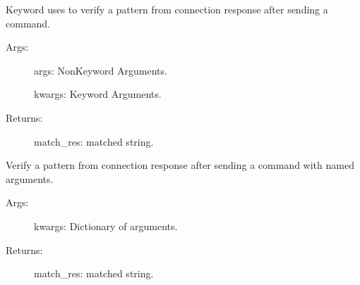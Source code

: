 \documentclass[letterpaper,10pt,english]{sphinxmanual}
\begin{document}
\begin{fulllineitems}
\begin{fulllineitems}
\begin{description}
\end{description}

\end{fulllineitems}


\begin{fulllineitems}
\label{\detokenize{QConnectionLibrary:QConnectionLibrary.connection_manager.ConnectionManager.verify}}
\sphinxAtStartPar
Keyword uses to verify a pattern from connection response after sending a command.
\begin{description}
\item[{Args:}] \leavevmode
\sphinxAtStartPar
args:   Non\sphinxhyphen{}Keyword Arguments.

\sphinxAtStartPar
kwargs:   Keyword Arguments.

\item[{Returns:}] \leavevmode
\sphinxAtStartPar
match\_res: matched string.

\end{description}

\end{fulllineitems}


\begin{fulllineitems}
\label{\detokenize{QConnectionLibrary:QConnectionLibrary.connection_manager.ConnectionManager.verify_named_args}}
\sphinxAtStartPar
Verify a pattern from connection response after sending a command with named arguments.
\begin{description}
\item[{Args:}] \leavevmode
\sphinxAtStartPar
kwargs: Dictionary of arguments.

\item[{Returns:}] \leavevmode
\sphinxAtStartPar
match\_res: matched string.

\end{description}


\end{fulllineitems}
\end{fulllineitems}
\end{document}
